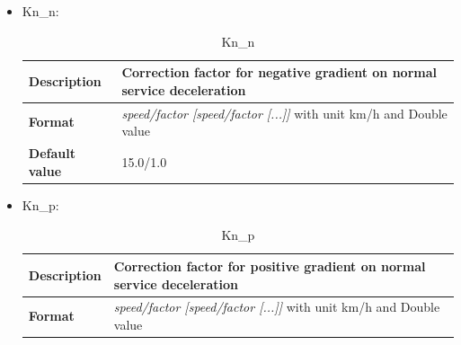 \begin{itemize}
	
	\item Kn\_n:
	\begin{longtable}{|l|l|}
		\caption{Kn\_n}\\
		\hline
		
		\begin{minipage}[t]{0.22\linewidth} \textbf{Description}	\end{minipage}
		&	\begin{minipage}[t]{0.78\linewidth} Correction factor for negative gradient on normal service deceleration \end{minipage} \\
		
		\hline
		
		\begin{minipage}[t]{0.22\linewidth} \textbf{Format}	\end{minipage}
		&	\begin{minipage}[t]{0.78\linewidth} \textit{speed/factor [speed/factor [...]]}  with unit km/h and Double value\end{minipage} \\
		
		\hline
		
		\begin{minipage}[t]{0.22\linewidth} \textbf{Default value}	\end{minipage}
		&	\begin{minipage}[t]{0.78\linewidth} 15.0/1.0 \end{minipage} \\
		
		\hline
	\end{longtable}
	
	\item Kn\_p:
	\begin{longtable}{|l|l|}
		\caption{Kn\_p}\\
		\hline
		
		\begin{minipage}[t]{0.22\linewidth} \textbf{Description}	\end{minipage}
		&	\begin{minipage}[t]{0.78\linewidth} Correction factor for positive gradient on normal service deceleration \end{minipage} \\
		
		\hline
		
		\begin{minipage}[t]{0.22\linewidth} \textbf{Format}	\end{minipage}
		&	\begin{minipage}[t]{0.78\linewidth} \textit{speed/factor [speed/factor [...]]}  with unit km/h and Double value\end{minipage} \\
		

\end{longtable}
\end{itemize}
